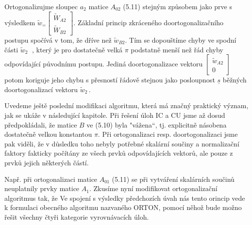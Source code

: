 Ortogonalizujme sloupec $a_2$ matice $A_{02}$ (5.11) stejným způsobem
jako prve s výsledkem
%
$\widetilde w_ =
\begin{bmatrix}
  \widetilde W_{A2} \\ \widetilde W_{B2}
\end{bmatrix}${.}
%
Základní princip zkráceného doortogonalizačního postupu spočívá v tom,
že dříve než  $\widetilde w_{B2}$. Tím se dopouštíme chyby ve spodní
části $\widetilde w_2\;$ , který je pro dostatečně velká
$\pi$ podstatně menší než řád chyby \Ocal{\pi\delta}
odpovídající původnímu postupu. Jediná doortogonalizace vektoru
%
$\begin{bmatrix} \widetilde w_{A2} \\ 0  \end{bmatrix}$
%
potom koriguje jeho chybu s přesností řádově stejnou jako
posloupnost $\underline s$ běžných doortogonalizací vektoru
%
$\widetilde w_2$\,.




Uvedeme ještě poslední modifikaci algoritmu, která má značný
praktický význam, jak se ukáže v následující kapitole. Při
řešení úloh IC a CU jsme až dosud předpokládali, že matice $B$ ve
(5.10) byla "vážena“, tj. explicitně násobena dostatečně velkou
konstantou $\pi$. Při ortogonalizaci resp. doortogonalizaci jsme
pak viděli, že v důsledku toho nebyly potřebné skalární součiny
a normalizační faktory fakticky počítány ze všech prvků
odpovídajících vektorů, ale pouze z prvků jejich některých částí.

Např.  při ortogonalizaci matice $A_{01}$ (5.11) se při vytváření
skalárních součinů neuplatnily prvky matice $A_1$. Zkusíme nyní
modifikovat ortogonalizační algoritmus tak, že 
Ve spojení s výsledky předchozích úvah nás tento orincip vede k
formulaci obecného algoritmu nazvaného ORTON, pomocí něhož bude možno
řešit všechny čtyři kategorie vyrovnávacích úloh.




